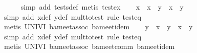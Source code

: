 \begin{isabellebody}
\ \ \ \ \isamarkupfalse%
\ {}simp\ add{}\ tests{}def{}\ metis\ test{}ex{}\isanewline
\isanewline
\ \ \isamarkupfalse%
\ {}x\ {}\ {}x\ {}\ y{}\ {}\ x\ {}\ y{}\isanewline
\ \ \ \ \isamarkupfalse%
\ {}simp\ add{}\ x{}{}def\ y{}{}def\ mult{}to{}test{}\ rule\ test{}eq{}\isanewline
\ \ \ \ \isamarkupfalse%
\ {}metis\ UNIV{}I\ ba{}meet{}assoc\ ba{}meet{}idem{}\isanewline
\isanewline
\ \ \isamarkupfalse%
\ {}y\ {}\ {}x\ {}\ y{}\ {}\ x\ {}\ y{}\isanewline
\ \ \ \ \isamarkupfalse%
\ {}simp\ add{}\ x{}{}def\ y{}{}def\ mult{}to{}test{}\ rule\ test{}eq{}\isanewline
\ \ \ \ \isamarkupfalse%
\ {}metis\ UNIV{}I\ ba{}meet{}assoc\ ba{}meet{}comm\ ba{}meet{}idem{}\isanewline

\end{isabellebody}
